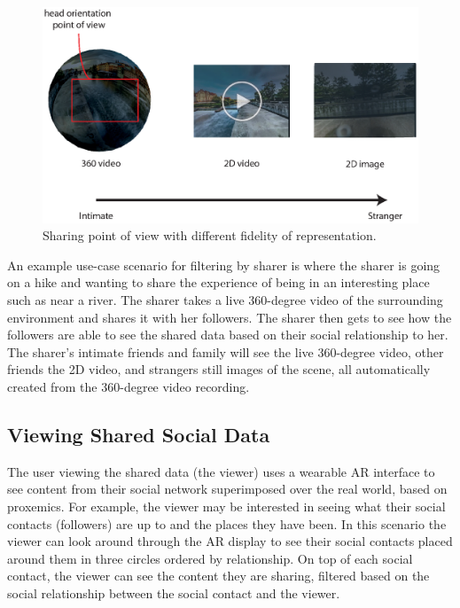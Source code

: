 \begin{figure}[H]
    \centering
    \includegraphics[width=.8\linewidth]{images/chi/images2.0-09.eps}
    \caption{Sharing point of view with different fidelity of representation.}
    \label{fig:data:sharer}
\end{figure}

An example use-case scenario for filtering by sharer is where the sharer is going on a hike and wanting to share the experience of being in an interesting place such as near a river. The sharer takes a live 360-degree video of the surrounding environment and shares it with her followers. The sharer then gets to see how the followers are able to see the shared data based on their social relationship to her. The sharer's intimate friends and family will see the live 360-degree video, other friends the 2D video, and strangers still images of the scene, all automatically created from the 360-degree video recording.

\subsection{Viewing Shared Social Data}

The user viewing the shared data (the viewer) uses a wearable AR interface to see content from their social network superimposed over the real world, based on proxemics. For example, the viewer may be interested in seeing what their social contacts (followers) are up to and the places they have been. In this scenario the viewer can look around through the AR display to see their social contacts placed around them in three circles ordered by relationship. On top of each social contact, the viewer can see the content they are sharing, filtered based on the social relationship between the social contact and the viewer.

